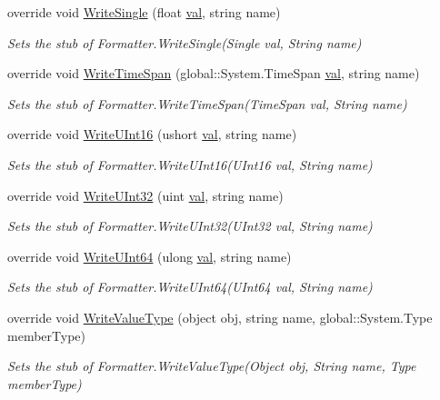 \begin{DoxyCompactItemize}
override void \hyperlink{class_system_1_1_runtime_1_1_serialization_1_1_fakes_1_1_stub_formatter_a0ddea965332b1451f9b3e3b461072149}{Write\-Single} (float \hyperlink{jquery-1_810_82-vsdoc_8js_a0888cacd53defa08fbb4972d54ece4b0}{val}, string name)
\begin{DoxyCompactList}\small\item\em Sets the stub of Formatter.\-Write\-Single(\-Single val, String name)\end{DoxyCompactList}\item 
override void \hyperlink{class_system_1_1_runtime_1_1_serialization_1_1_fakes_1_1_stub_formatter_af3a2dbf220ccfd30f0caf6beedabdf41}{Write\-Time\-Span} (global\-::\-System.\-Time\-Span \hyperlink{jquery-1_810_82-vsdoc_8js_a0888cacd53defa08fbb4972d54ece4b0}{val}, string name)
\begin{DoxyCompactList}\small\item\em Sets the stub of Formatter.\-Write\-Time\-Span(\-Time\-Span val, String name)\end{DoxyCompactList}\item 
override void \hyperlink{class_system_1_1_runtime_1_1_serialization_1_1_fakes_1_1_stub_formatter_aec3aba493de5b0d9226decc682eb8daa}{Write\-U\-Int16} (ushort \hyperlink{jquery-1_810_82-vsdoc_8js_a0888cacd53defa08fbb4972d54ece4b0}{val}, string name)
\begin{DoxyCompactList}\small\item\em Sets the stub of Formatter.\-Write\-U\-Int16(\-U\-Int16 val, String name)\end{DoxyCompactList}\item 
override void \hyperlink{class_system_1_1_runtime_1_1_serialization_1_1_fakes_1_1_stub_formatter_a7e2cc1481660aa6aa2593a4095c701e9}{Write\-U\-Int32} (uint \hyperlink{jquery-1_810_82-vsdoc_8js_a0888cacd53defa08fbb4972d54ece4b0}{val}, string name)
\begin{DoxyCompactList}\small\item\em Sets the stub of Formatter.\-Write\-U\-Int32(\-U\-Int32 val, String name)\end{DoxyCompactList}\item 
override void \hyperlink{class_system_1_1_runtime_1_1_serialization_1_1_fakes_1_1_stub_formatter_ad0cf4c71ed0f0f6a81599b39c11a67c5}{Write\-U\-Int64} (ulong \hyperlink{jquery-1_810_82-vsdoc_8js_a0888cacd53defa08fbb4972d54ece4b0}{val}, string name)
\begin{DoxyCompactList}\small\item\em Sets the stub of Formatter.\-Write\-U\-Int64(\-U\-Int64 val, String name)\end{DoxyCompactList}\item 
override void \hyperlink{class_system_1_1_runtime_1_1_serialization_1_1_fakes_1_1_stub_formatter_ad88f782f8204f6a7653d3ffe3dee33c5}{Write\-Value\-Type} (object obj, string name, global\-::\-System.\-Type member\-Type)
\begin{DoxyCompactList}\small\item\em Sets the stub of Formatter.\-Write\-Value\-Type(\-Object obj, String name, Type member\-Type)\end{DoxyCompactList}\end{DoxyCompactItemize}
